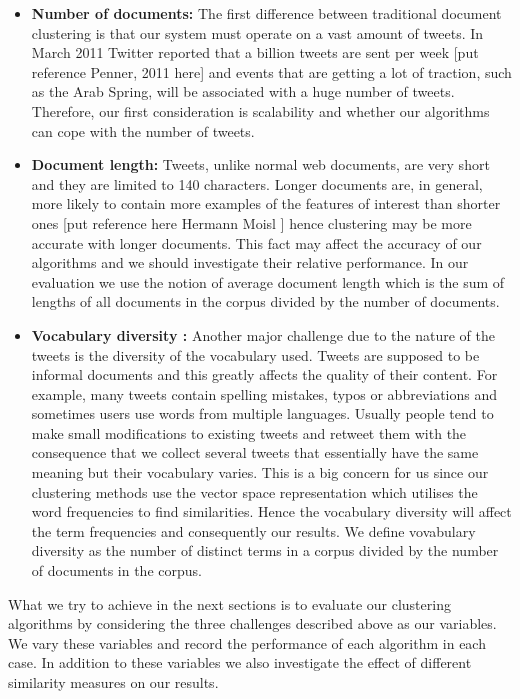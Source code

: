 \begin{itemize}
   \item \textbf{Number of documents:} The first difference between traditional document clustering is that our system must operate on a vast amount 
   of tweets. In March 2011 Twitter reported that a billion tweets are sent per week [put reference Penner, 2011 here] and events that are getting a lot 
   of traction, such as the Arab Spring, will be associated with a huge number of tweets. Therefore, our first consideration is scalability and whether our algorithms can cope with the 
   number of tweets.    
   \item \textbf{Document length:} Tweets, unlike normal web documents, are very short and they are limited to 140 characters. Longer documents are, in general, more likely
  to contain more examples of the features of interest than shorter ones [put reference here Hermann Moisl ] hence clustering may be more accurate with longer documents. This fact may 
  affect the accuracy of our algorithms and we should investigate their relative performance. In our evaluation we use the notion of average document length which is the sum of lengths of all documents 
  in the corpus divided by the number of documents. 
   \item \textbf{Vocabulary diversity :} Another major challenge due to the nature of the tweets is the diversity of the vocabulary used. Tweets are supposed to be informal documents
   and this greatly affects the quality of their content. For example, many tweets contain spelling mistakes, typos or abbreviations and sometimes users use words from multiple languages.
   Usually people tend to make small modifications to existing tweets and retweet them with the consequence that we collect several tweets that essentially have the same meaning but their
   vocabulary varies. This is a big concern for us since our clustering methods use the vector space representation which utilises the word frequencies to find similarities. Hence the vocabulary 
   diversity will affect the term frequencies and consequently our results. We define vovabulary diversity as the number of distinct terms in a corpus divided by the number of documents in the corpus.
\end{itemize} 
What we try to achieve in the next sections is to evaluate our clustering algorithms by considering the three challenges described above as our variables. We vary these variables and 
record the performance of each algorithm in each case. In addition to these variables we also investigate the effect of different similarity measures on our results. 

